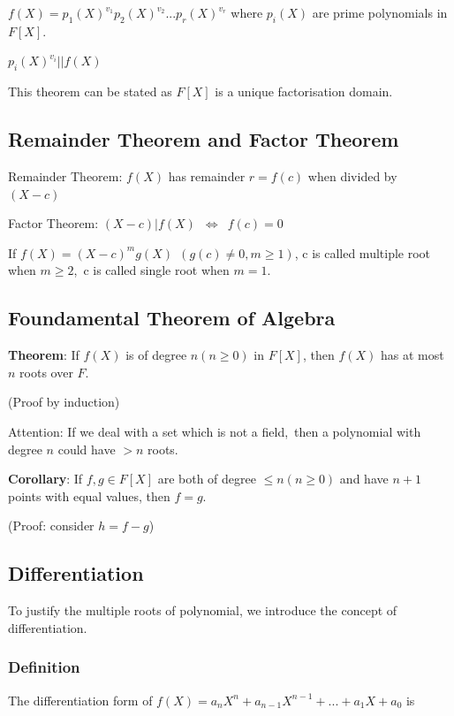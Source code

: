 \documentclass{article}
\begin{document}
\begin{center}
$f(X) = p_1(X)^{v_1} p_2(X)^{v_2}... p_r(X)^{v_r}$
where $p_i(X)$ are prime polynomials in $F[X]$.

\vspace{0.15cm}
$p_i(X)^{v_i}||f(X)$
\end{center}

\noindent
This theorem can be stated as $F[X]$ is a unique factorisation domain.

\subsection{Remainder Theorem and Factor Theorem}
Remainder Theorem: $f(X)$ has remainder $r=f(c)$ when divided by $(X-c)$

\noindent
Factor Theorem: $(X-c)|f(X)$\  $\Leftrightarrow$\ $f(c)=0$

\vspace{0.1cm}
\noindent
If $f(X)=(X-c)^m g(X)\ \ (g(c)\neq 0, m \ge 1)$, c is called multiple root when $m \ge 2$,\ 
c is called single root when $m=1$.

\subsection{Foundamental Theorem of Algebra}
\textbf{Theorem}: If $f(X)$ is of degree $n (n \ge 0)$ in $F[X]$, then $f(X)$ has at most $n$ roots over $F$.

\noindent
(Proof by induction)

\noindent
Attention: If we deal with a set which is not a field,\ 
then a polynomial with degree $n$ could have $>n$ roots. 

\vspace{0.2cm}
\noindent
\textbf{Corollary}: If $f, g \in F[X]$ are both of degree $\le n (n \ge 0)$ and have $n+1$ points with equal values, then $f=g$.

\noindent
(Proof: consider $h = f - g$)

\subsection{Differentiation}
To justify the multiple roots of polynomial, we introduce the concept of differentiation.

\subsubsection{Definition}
The differentiation form of $f(X)= a_n X^n + a_{n-1} X^{n-1} +...+ a_1 X + a_0$ is
\end{document}
